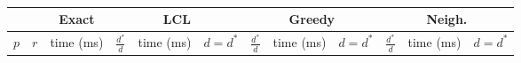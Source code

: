 
\begin{table}[ht!]
	\centering
	\def\arraystretch{1.2}
	\setlength\tabcolsep{0.075cm}
	\begin{tabular}{| c | c | c | c | c | c | c | c | c |  c | c | c | }
		\hline
		& & Exact & \multicolumn{3}{c|}{LCL} & \multicolumn{3}{c|}{Greedy} & \multicolumn{3}{c|}{Neigh.} \\
		\hline
		$p$ & $r$ & time (ms) & $\frac{d^*}{d}$ & time (ms) & $d = d^*$ &  $\frac{d^*}{d}$ & time (ms) & $d = d^*$ &  $\frac{d^*}{d}$ & time (ms) & $d = d^*$ \\
		\hline
	\end{tabular}
	\caption{}
	\label{tab:heuristices:numericalresults:biginstances}
\end{table}

